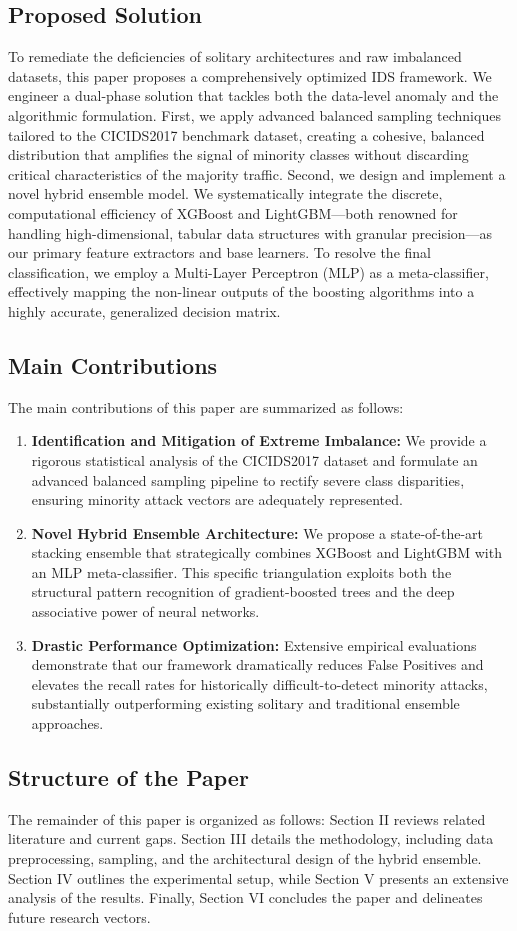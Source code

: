\subsection{Proposed Solution}
To remediate the deficiencies of solitary architectures and raw imbalanced datasets, this paper proposes a comprehensively optimized IDS framework. We engineer a dual-phase solution that tackles both the data-level anomaly and the algorithmic formulation. First, we apply advanced balanced sampling techniques tailored to the CICIDS2017 benchmark dataset, creating a cohesive, balanced distribution that amplifies the signal of minority classes without discarding critical characteristics of the majority traffic. Second, we design and implement a novel hybrid ensemble model. We systematically integrate the discrete, computational efficiency of XGBoost and LightGBM—both renowned for handling high-dimensional, tabular data structures with granular precision—as our primary feature extractors and base learners. To resolve the final classification, we employ a Multi-Layer Perceptron (MLP) as a meta-classifier, effectively mapping the non-linear outputs of the boosting algorithms into a highly accurate, generalized decision matrix.

\subsection{Main Contributions}
The main contributions of this paper are summarized as follows:
\begin{enumerate}
    \item \textbf{Identification and Mitigation of Extreme Imbalance:} We provide a rigorous statistical analysis of the CICIDS2017 dataset and formulate an advanced balanced sampling pipeline to rectify severe class disparities, ensuring minority attack vectors are adequately represented.
    \item \textbf{Novel Hybrid Ensemble Architecture:} We propose a state-of-the-art stacking ensemble that strategically combines XGBoost and LightGBM with an MLP meta-classifier. This specific triangulation exploits both the structural pattern recognition of gradient-boosted trees and the deep associative power of neural networks.
    \item \textbf{Drastic Performance Optimization:} Extensive empirical evaluations demonstrate that our framework dramatically reduces False Positives and elevates the recall rates for historically difficult-to-detect minority attacks, substantially outperforming existing solitary and traditional ensemble approaches.
\end{enumerate}

\subsection{Structure of the Paper}
The remainder of this paper is organized as follows: Section II reviews related literature and current gaps. Section III details the methodology, including data preprocessing, sampling, and the architectural design of the hybrid ensemble. Section IV outlines the experimental setup, while Section V presents an extensive analysis of the results. Finally, Section VI concludes the paper and delineates future research vectors.
